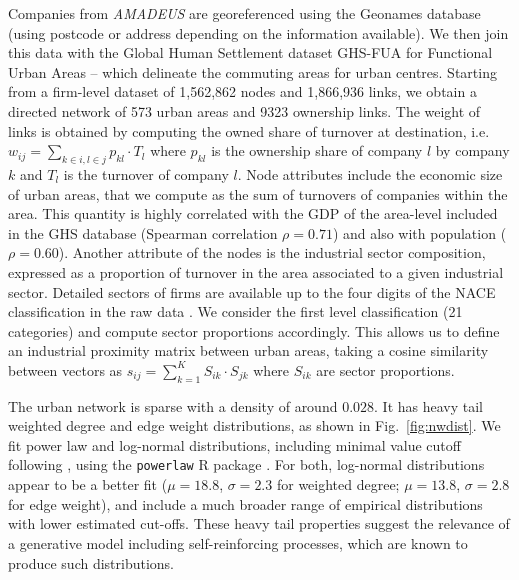 \documentclass[10pt,letterpaper]{article}
\begin{document}
Companies from \emph{AMADEUS} are georeferenced using the Geonames database (using postcode or address depending on the information available). We then join this data with the Global Human Settlement dataset GHS-FUA for Functional Urban Areas \cite{Florczyk2019ghs} -- which delineate the commuting areas for urban centres. Starting from a firm-level dataset of 1,562,862 nodes and 1,866,936 links, we obtain a directed network of 573 urban areas and 9323 ownership links. The weight of links is obtained by computing the owned share of turnover at destination, i.e. $w_{ij} = \sum_{k \in i,l \in j} p_{kl} \cdot T_l$ where $p_{kl}$ is the ownership share of company $l$ by company $k$ and $T_l$ is the turnover of company $l$. Node attributes include the economic size of urban areas, that we compute as the sum of turnovers of companies within the area. This quantity is highly correlated with the GDP of the area-level included in the GHS database (Spearman correlation $\rho = 0.71$) and also with population ($\rho = 0.60$). Another attribute of the nodes is the industrial sector composition, expressed as a proportion of turnover in the area associated to a given industrial sector. Detailed sectors of firms are available up to the four digits of the NACE classification in the raw data \cite{EUROSTAT2008}. We consider the first level classification (21 categories) and compute sector proportions accordingly. This allows us to define an industrial proximity matrix between urban areas, taking a cosine similarity between vectors as $s_{ij} = \sum_{k=1}^{K} S_{ik}\cdot S_{jk}$ where $S_{ik}$ are sector proportions.

The urban network is sparse with a density of around $0.028$. It has heavy tail weighted degree and edge weight distributions, as shown in Fig.~\ref{fig:nwdist}. We fit power law and log-normal distributions, including minimal value cutoff following \cite{clauset2009power}, using the \texttt{powerlaw} R package \cite{powerlawpackage}. For both, log-normal distributions appear to be a better fit ($\mu=18.8$, $\sigma=2.3$ for weighted degree; $\mu=13.8$, $\sigma=2.8$ for edge weight), and include a much broader range of empirical distributions with lower estimated cut-offs. These heavy tail properties suggest the relevance of a generative model including self-reinforcing processes, which are known to produce such distributions.
\end{document}
